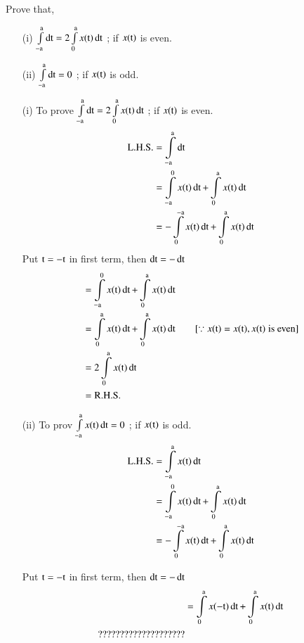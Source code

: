 \begin{exam*}
Prove that,
\begin{itemize}
\item[{\rm(i)}] $\int\limits_{-\rma}^{\rma}\dt = 2\int\limits_{0}^{\rma}x(\rmt)\dt$ \quad; if $x(\rmt)$ is even.

\item[{\rm(ii)}]  $\int\limits_{-\rma}^{\rma}\dt = 0$ \quad ; if $x(\rmt)$ is odd.
\end{itemize}
\end{exam*}
\begin{solution}
\begin{itemize}
\item[{\rm (i)}] To prove $\int\limits_{-\rma}^{\rma}\dt = 2\int\limits_{0}^{\rma}x(\rmt)\dt$ \quad; if $x(\rmt)$ is even.
\begin{align*}
\rmL.\rmH.\rmS. &= \int\limits_{-\rma}^{\rma}\dt\\
       &=\int\limits_{-\rma}^{0}x(\rmt)\dt +\int\limits_{0}^{\rma}x(\rmt)\dt\\
       &=-\int\limits_{0}^{-\rma}x(\rmt)\dt + \int\limits_{0}^{\rma}x(\rmt)\dt 
\end{align*}
Put $\rmt=-\rmt$ in first term, then $\dt =-\dt$
\begin{align*}
&=\int\limits_{-\rma}^{0}x(\rmt)\dt +\int\limits_{0}^{\rma}x(\rmt)\dt\\
&=\int\limits_{0}^{\rma}x(\rmt)\dt + \int\limits_{0}^{\rma}x(\rmt)\dt \qquad [\because x(\rmt) = x(\rmt), x(\rmt)\;
\text{is even}]\\
&=2 \int\limits_{0}^{\rma}x(\rmt)\dt\\
&=\rmR.\rmH.\rmS.
\end{align*}

\item[{\rm (ii)}] To prov $\int\limits_{-\rma}^{\rma} x(\rmt)\dt =0$ \quad ; if $x(\rmt)$ is odd.
\begin{align*}
\rmL.\rmH.\rmS. &= \int\limits_{-\rma}^{\rma}x(\rmt)\dt\\
                &= \int\limits_{-\rma}^{0}x(\rmt)\dt + \int\limits_{0}^{\rma}x(\rmt)\dt\\
                &= -\int\limits_{0}^{-\rma}x(\rmt)\dt + \int\limits_{0}^{\rma}x(\rmt)\dt
\end{align*}

Put $\rmt=-\rmt$ in first term, then $\dt =-\dt$
\begin{align*}
&= \int\limits_{0}^{\rma}x(-\rmt)\dt + \int\limits_{0}^{\rma}x(\rmt)\dt\\
????????????????????
\end{align*}
\end{itemize}
\end{solution}

